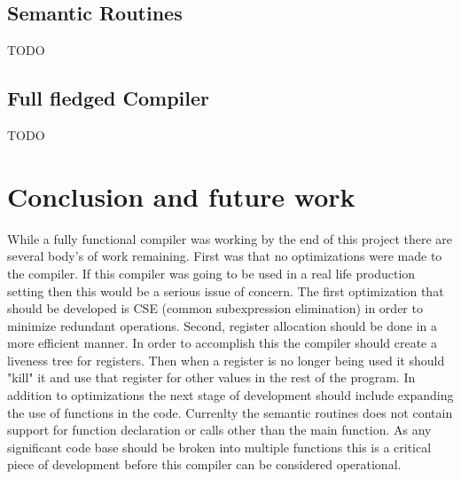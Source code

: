\documentclass[12pt]{article}
\begin{document}
    	\subsection{Semantic Routines}
    		TODO

    	\subsection{Full fledged Compiler}
    		TODO

    \section{Conclusion and future work}	
			While a fully functional compiler was working by the end of this project there are several body's of work remaining.  First was that no optimizations were made to the compiler.  If this compiler was going to be used in a real life production setting then this would be a serious issue of concern.  The first optimization that should be developed is CSE (common subexpression elimination) in order to minimize redundant operations.  Second, register allocation should be done in a more efficient manner.  In order to accomplish this the compiler should create a liveness tree for registers.  Then when a register is no longer being used it should "kill" it and use that register for other values in the rest of the program.  
			In addition to optimizations the next stage of development should include expanding the use of functions in the code.  Currenlty the semantic routines does not contain support for function declaration or calls other than the main function.  As any significant code base should be broken into multiple functions this is a critical piece of development before this compiler can be considered operational.
    
 
\end{document}
